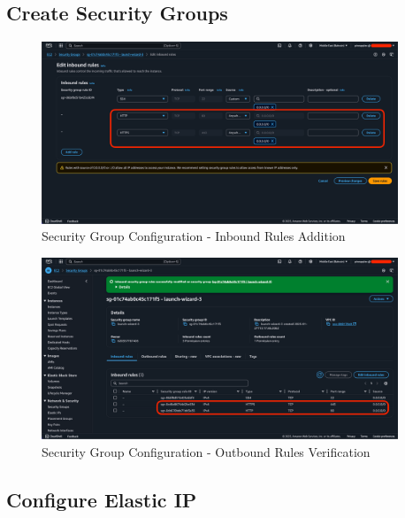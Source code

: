 \documentclass[a4paper,12pt]{article}
\begin{document}
\newpage

\subsection{Create Security Groups}

\begin{figure}[H]
    \centering
    \includegraphics[width=0.95\textwidth]{security-groups-1.png}
    \caption{Security Group Configuration - Inbound Rules Addition}
    \label{fig:security1}
\end{figure}

\begin{figure}[H]
    \centering
    \includegraphics[width=0.95\textwidth]{security-groups-2.png}
    \caption{Security Group Configuration - Outbound Rules Verification}
    \label{fig:security2}
\end{figure}

\newpage

\subsection{Configure Elastic IP}
\end{document}
